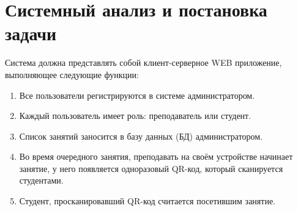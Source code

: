 \section{Системный анализ и постановка задачи}\label{sec:part1}
Система должна представлять собой клиент-серверное WEB приложение, выполняющее следующие функции:

\begin{enumerate}
    \item Все пользователи регистрируются в системе администратором.
    \item Каждый пользователь имеет роль: преподаватель или студент.
    \item Список занятий заносится в базу данных (БД) администратором.
    \item Во время очередного занятия, преподавать на своём устройстве начинает занятие, у него появляется одноразовый QR-код, который сканируется студентами.
    \item Студент, просканировавший QR-код считается посетившим занятие.
\end{enumerate}


